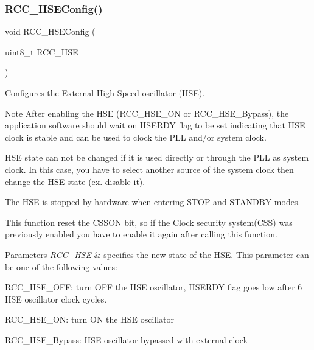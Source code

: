 \subsubsection{\texorpdfstring{R\+C\+C\+\_\+\+H\+S\+E\+Config()}{RCC\_HSEConfig()}}
{\footnotesize\ttfamily void R\+C\+C\+\_\+\+H\+S\+E\+Config (\begin{DoxyParamCaption}\item[{uint8\+\_\+t}]{R\+C\+C\+\_\+\+H\+SE }\end{DoxyParamCaption})}



Configures the External High Speed oscillator (H\+SE). 

\begin{DoxyNote}{Note}
After enabling the H\+SE (R\+C\+C\+\_\+\+H\+S\+E\+\_\+\+ON or R\+C\+C\+\_\+\+H\+S\+E\+\_\+\+Bypass), the application software should wait on H\+S\+E\+R\+DY flag to be set indicating that H\+SE clock is stable and can be used to clock the P\+LL and/or system clock. 

H\+SE state can not be changed if it is used directly or through the P\+LL as system clock. In this case, you have to select another source of the system clock then change the H\+SE state (ex. disable it). 

The H\+SE is stopped by hardware when entering S\+T\+OP and S\+T\+A\+N\+D\+BY modes. ~\newline


This function reset the C\+S\+S\+ON bit, so if the Clock security system(\+C\+S\+S) was previously enabled you have to enable it again after calling this function. ~\newline

\end{DoxyNote}

\begin{DoxyParams}{Parameters}
{\em R\+C\+C\+\_\+\+H\+SE} & specifies the new state of the H\+SE. This parameter can be one of the following values\+: \begin{DoxyItemize}
\item R\+C\+C\+\_\+\+H\+S\+E\+\_\+\+O\+FF\+: turn O\+FF the H\+SE oscillator, H\+S\+E\+R\+DY flag goes low after 6 H\+SE oscillator clock cycles. \item R\+C\+C\+\_\+\+H\+S\+E\+\_\+\+ON\+: turn ON the H\+SE oscillator \item R\+C\+C\+\_\+\+H\+S\+E\+\_\+\+Bypass\+: H\+SE oscillator bypassed with external clock \end{DoxyItemize}
\\
\hline
\end{DoxyParams}

